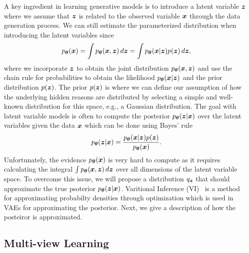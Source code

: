 A key ingredient in learning generative models is to introduce a latent variable ${\bm{z}}$ where we assume that ${\bm{z}}$ is related to the observed variable ${\bm{x}}$ through the data generation process. We can still estimate the parameterized distribution when introducing the latent variables since
\begin{align}
	p_{{\bm{\theta}}}({\bm{x}}) = \int p_{{\bm{\theta}}}({\bm{x}}, {\bm{z}}) \,d{\bm{z}} = \int p_{{\bm{\theta}}}({\bm{x}} | {\bm{z}}) p({\bm{z}}) \,d{\bm{z}},
\end{align}
where we incorporate ${\bm{z}}$ to obtain the joint distribution $p_{{\bm{\theta}}}({\bm{x}}, {\bm{z}})$ and use the chain rule for probabilities to obtain the likelihood $p_{{\bm{\theta}}}({\bm{x}} | {\bm{z}})$ and the prior distribution $p({\bm{z}})$. The prior $p({\bm{z}})$ is where we can define our assumption of how the underlying hidden reasons are distributed by selecting a simple and well-known distribution for this space, e.g., a Gaussian distribution. The goal with latent variable models is often to compute the posterior $p_{{\bm{\theta}}}({\bm{z}} | {\bm{x}})$ over the latent variables given the data ${\bm{x}}$ which can be done using Bayes' rule
\begin{align}
	p_{{\bm{\theta}}}({\bm{z}} | {\bm{x}}) = \frac{p_{{\bm{\theta}}}({\bm{x}} | {\bm{z}}) p({\bm{z}})}{p_{{\bm{\theta}}}({\bm{x}})}. 
\end{align}
Unfortunately, the evidence $p_{{\bm{\theta}}}({\bm{x}})$ is very hard to compute as it requires calculating the integral $\int p_{{\bm{\theta}}}({\bm{x}}, {\bm{z}}) \,d{\bm{z}}$ over all dimensions of the latent variable space. To overcome this issue, we will propose a distribution $q_{{\bm{z}}}$ that should approximate the true psoterior $p_{{\bm{\theta}}}({\bm{z}} | {\bm{x}})$. Varitional Inference (VI)~\cite{blei2017variational, zhang2018advances} is a method for approximating probabilty densities through optimization which is used in VAEs for approximating the posterior. Next, we give a description of how the posteiror is approximated.




\subsection{Multi-view Learning}


